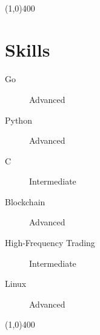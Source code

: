 \documentclass[10pt,a4paper]{article}
\newcommand{\hr}{\noindent\line(1,0){400}}
\newcommand{\CPP}{C\nolinebreak\hspace{-.05em}\raisebox{.5ex}{\tiny\textbf{++}}}
\newcommand{\CS}{C\nolinebreak\hspace{-.05em}\raisebox{.6ex}{\scriptsize\textbf\#}}
\begin{document}
\vskip 0.05in
\\

\hr
\section*{Skills}
\vskip 0.03in
\begin{multicols}{2}
\begin{description}
\item[Go] Advanced
\item[Python] Advanced
\item[\CPP] Intermediate
\end{description}
\columnbreak
\begin{description}
\item[Blockchain] Advanced
\item[High-Frequency Trading] Intermediate
\item[Linux] Advanced
\end{description}
\end{multicols}

\hr
\end{document}
